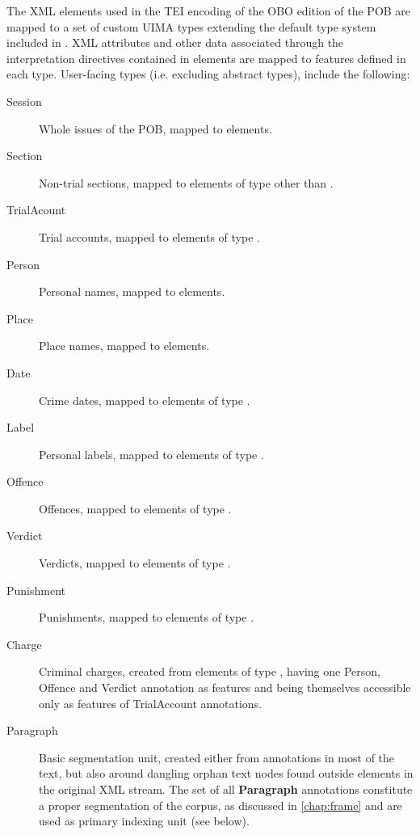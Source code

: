 The XML elements used in the TEI encoding of the OBO edition of the POB are mapped to a set of custom UIMA types extending the default type system included in .
XML attributes and other data associated through the interpretation directives contained in  elements are mapped to features defined in each type.
User-facing types (i.e. excluding abstract types), include the following:

\begin{description}
    \item [Session]     Whole issues of the POB, mapped to  elements.
    \item [Section]     Non-trial sections, mapped to  elements of type other than .
    \item [TrialAcount] Trial accounts, mapped to  elements of type .
    \item [Person]      Personal names, mapped to  elements.
    \item [Place]       Place names, mapped to  elements.
    \item [Date]        Crime dates, mapped to  elements of type .
    \item [Label]       Personal labels, mapped to  elements of type .
    \item [Offence]     Offences, mapped to  elements of type .
    \item [Verdict]     Verdicts, mapped to  elements of type .
    \item [Punishment]  Punishments, mapped to  elements of type .
    \item [Charge]      Criminal charges, created from  elements of type , having one Person, Offence and Verdict annotation as features and being themselves accessible only as features of TrialAccount annotations.
    \item [Paragraph]   Basic segmentation unit, created either from  annotations in most of the text, but also around dangling orphan text nodes found outside  elements in the original XML stream.
    The set of all \textbf{Paragraph} annotations constitute a proper segmentation of the corpus, as discussed in \autoref{chap:frame} and are used as primary indexing unit (see below).
\end{description}

